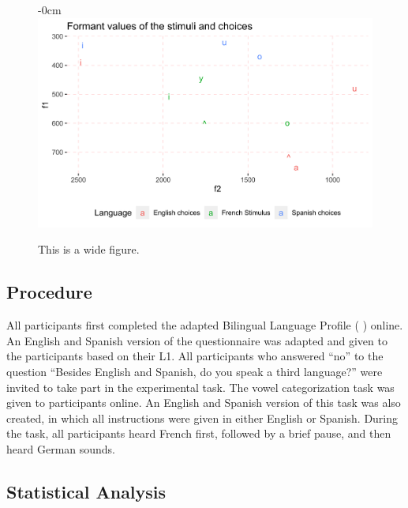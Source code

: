 \documentclass[preprints]{Definitions/mdpi}
\begin{document}
\begin{figure}[H]
\begin{adjustwidth}{-\extralength}{0cm}
\centering
\includegraphics[width=13.5cm]{figs/stimuli.png}
\end{adjustwidth}
\caption{This is a wide figure.\label{stimuli}}
\end{figure}

\hypertarget{procedure}{%
\subsection{Procedure}\label{procedure}}

All participants first completed the adapted Bilingual Language Profile (\citeauthor{birdsong_bilingual_2012} \citeyear{birdsong_bilingual_2012}) online.
An English and Spanish version of the questionnaire was adapted and given to the participants based on their L1.
All participants who answered ``no'' to the question ``Besides English and Spanish, do you speak a third language?'' were invited to take part in the experimental task.
The vowel categorization task was given to participants online. An English and Spanish version of this task was also created, in which all instructions were given in either English or Spanish.
During the task, all participants heard French first, followed by a brief pause, and then heard German sounds.

\hypertarget{statistical-analysis}{%
\subsection{Statistical Analysis}\label{statistical-analysis}}
\end{document}
